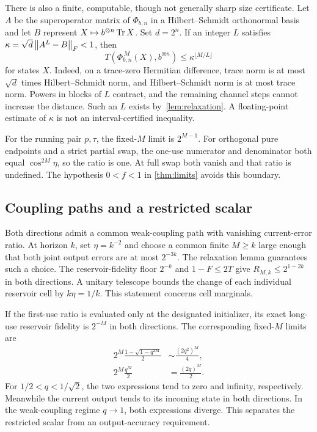 There is also a finite, computable, though not generally sharp size certificate. Let $A$ be the superoperator matrix of $\Phi_{b,n}$ in a Hilbert--Schmidt orthonormal basis and let $B$ represent $X\mapsto b^{\otimes n}\operatorname{Tr} X$. Set $d=2^n$. If an integer $L$ satisfies $\kappa=\sqrt d\left\lVert A^L-B\right\rVert_F<1$, then
\begin{equation}
 T(\Phi_{b,n}^{\,M}(X),b^{\otimes n})\le\kappa^{\lfloor M/L\rfloor}
\end{equation}
for states $X$. Indeed, on a trace-zero Hermitian difference, trace norm is at most $\sqrt d$ times Hilbert--Schmidt norm, and Hilbert--Schmidt norm is at most trace norm. Powers in blocks of $L$ contract, and the remaining channel steps cannot increase the distance. Such an $L$ exists by~\cref{lem:relaxation}. A floating-point estimate of $\kappa$ is not an interval-certified inequality.


For the running pair $p,\tau$, the fixed-$M$ limit is $2^{M-1}$. For orthogonal pure endpoints and a strict partial swap, the one-use numerator and denominator both equal $\cos^{2M}\eta$, so the ratio is one. At full swap both vanish and that ratio is undefined. The hypothesis $0<f<1$ in \cref{thm:limits} avoids this boundary.

\subsection{Coupling paths and a restricted scalar}
Both directions admit a common weak-coupling path with vanishing current-error ratio. At horizon $k$, set $\eta=k^{-2}$ and choose a common finite $M\ge k$ large enough that both joint output errors are at most $2^{-3k}$. The relaxation lemma guarantees such a choice. The reservoir-fidelity floor $2^{-k}$ and $1-F\le2T$ give $R_{M,k}\le2^{1-2k}$ in both directions. A unitary telescope bounds the change of each individual reservoir cell by $k\eta=1/k$. This statement concerns cell marginals.

If the first-use ratio is evaluated only at the designated initializer, its exact long-use reservoir fidelity is $2^{-M}$ in both directions. The corresponding fixed-$M$ limits are
\begin{align}
 2^M\frac{1-\sqrt{1-q^{2M}}}{2}
 &\sim\frac{(2q^2)^M}{4},\nonumber\\
 2^M\frac{q^M}{2}&=\frac{(2q)^M}{2}.
 \label{eq:restrictedscalar}
\end{align}
For $1/2<q<1/\sqrt2$, the two expressions tend to zero and infinity, respectively. Meanwhile the current output tends to its incoming state in both directions. In the weak-coupling regime $q\to1$, both expressions diverge. This separates the restricted scalar from an output-accuracy requirement.
